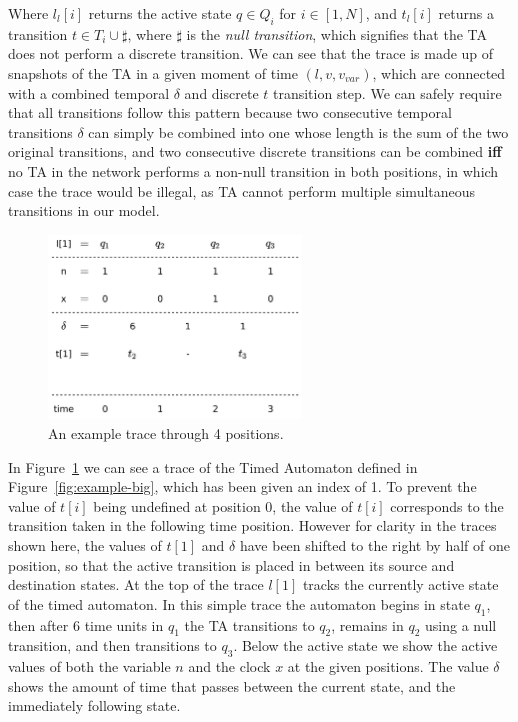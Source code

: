\documentclass[a4paper,11pt]{report}
\theoremstyle{definition}
\begin{document}
Where $l_{l}[i]$ returns the active state $q \in Q_{i}$ for $i \in [1,N]$, and
$t_{l}[i]$ returns a transition $t \in T_{i} \cup \sharp$, where $\sharp$ is the
\emph{null transition}, which signifies that the TA does not perform a discrete
transition. We can see that the trace is made up of snapshots of the TA in a
given moment of time $(l,v,v_{var})$, which are connected with a combined
temporal $\delta$ and discrete $t$ transition step. We can safely require that
all transitions follow this pattern because two consecutive temporal transitions
$\delta$ can simply be combined into one whose length is the sum of the two
original transitions, and two consecutive discrete transitions can be combined
\textbf{iff} no TA in the network performs a non-null transition in both
positions, in which case the trace would be illegal, as TA cannot perform
multiple simultaneous transitions in our model.

\begin{figure}[h]
  \centering
  \includegraphics[width=0.6\textwidth]{trace-shift-min}
  \caption{An example trace through 4 positions.}
  \label{fig:trace-min}
\end{figure}

In Figure~\ref{fig:trace-min} we can see a trace of the Timed Automaton defined
in Figure~\ref{fig:example-big}, which has been given an index of 1. To prevent
the value of $t[i]$ being undefined at position $0$, the value of $t[i]$
corresponds to the transition taken in the following time position. However for
clarity in the traces shown here, the values of $t[1]$ and $\delta$ have been
shifted to the right by half of one position, so that the active transition is
placed in between its source and destination states. At the top of the trace
$l[1]$ tracks the currently active state of the timed automaton. In this simple
trace the automaton begins in state $q_{1}$, then after $6$ time units in
$q_{1}$ the TA transitions to $q_{2}$, remains in
$q_{2}$ using a null transition, and then transitions to $q_{3}$. Below the active
state we show the active values of both the variable $n$ and the clock $x$ at
the given positions. The value $\delta$ shows the amount of time that passes
between the current state, and the immediately following state.
\end{document}
